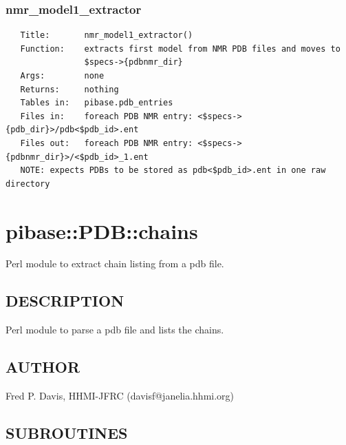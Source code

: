 \documentclass{article}
\begin{document}
\subsubsection*{nmr\_model1\_extractor\label{pibase::PDB_nmr_model1_extractor}}
\begin{verbatim}
   Title:       nmr_model1_extractor()
   Function:    extracts first model from NMR PDB files and moves to 
                $specs->{pdbnmr_dir}
   Args:        none
   Returns:     nothing
   Tables in:   pibase.pdb_entries
   Files in:    foreach PDB NMR entry: <$specs->{pdb_dir}>/pdb<$pdb_id>.ent
   Files out:   foreach PDB NMR entry: <$specs->{pdbnmr_dir}>/<$pdb_id>_1.ent
   NOTE: expects PDBs to be stored as pdb<$pdb_id>.ent in one raw directory
\end{verbatim}
\clearpage
\section{pibase::PDB::chains\label{pibase::PDB::chains}}


Perl module to extract chain listing from a pdb file.

\subsection*{DESCRIPTION\label{pibase::PDB::chains_DESCRIPTION}}


Perl module to parse a pdb file and lists the chains.

\subsection*{AUTHOR\label{pibase::PDB::chains_AUTHOR}}


Fred P. Davis, HHMI-JFRC (davisf@janelia.hhmi.org)

\subsection*{SUBROUTINES\label{pibase::PDB::chains_SUBROUTINES}}
\end{document}
